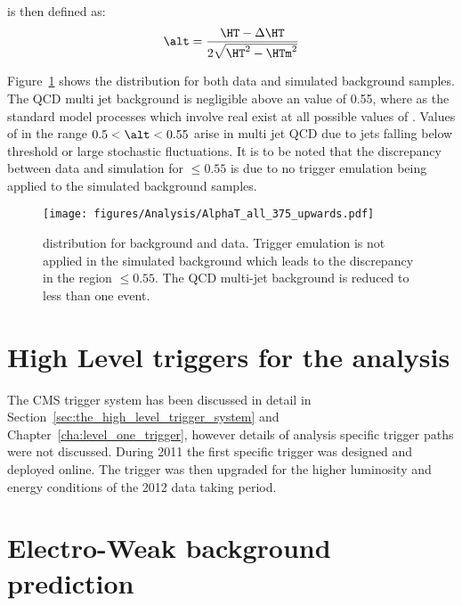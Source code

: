 \alt is then defined as:
\begin{equation}
  \alt = \frac{\HT - \Delta\HT}{2\sqrt{\HT^{2}-\HTm^{2}}}
\end{equation}


Figure~\ref{fig:figures_Analysis_AlphaT_all_375_upwards} shows the \alt 
distribution for both data and simulated background samples. The QCD multi jet 
background is negligible above an \alt value of 0.55, where as the standard 
model processes which involve real \MET exist at all possible values of \alt.
Values of \alt in the range $0.5 < \alt < 0.55$ arise in multi jet QCD due to 
jets falling below threshold or large stochastic fluctuations.
It is to be noted that the discrepancy between data and simulation for \alt 
$\leq 0.55$ is due to no trigger emulation being applied to the simulated 
background samples.
\begin{figure}[ht!]
  \centering  \texttt{[image: figures/Analysis/AlphaT\_all\_375\_upwards.pdf]}
  \caption{\alt distribution for background and data. Trigger emulation is not 
  applied in the simulated background which leads to the discrepancy in the 
  region \alt $\leq 0.55$. The QCD multi-jet background is reduced to less than 
  one event.}
  \label{fig:figures_Analysis_AlphaT_all_375_upwards}
\end{figure}




\section{High Level triggers for the \alt analysis} %
\label{sec:high_level_triggers_for_the_alt_analysis}
The CMS trigger system has been discussed in detail in 
Section~\ref{sec:the_high_level_trigger_system} and 
Chapter~\ref{cha:level_one_trigger}, however details of analysis specific 
trigger paths were not discussed. During 2011 the first \alt specific trigger 
was designed and deployed online. The trigger was then upgraded for the higher 
luminosity and energy conditions of the 2012 data taking period.




\section{Electro-Weak background prediction} %
\label{sec:electro_weak_background_prediction}


